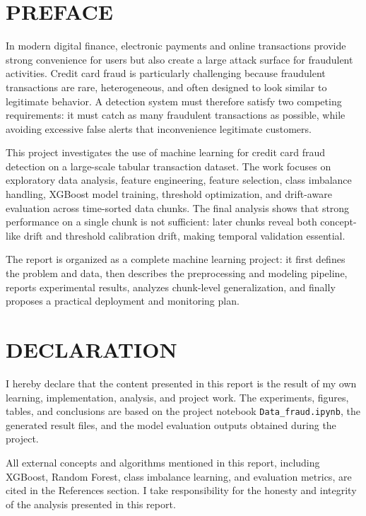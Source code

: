 \documentclass[12pt,a4paper,twoside]{article}
\newcommand{\frontsection}[1]{%
    \section*{\centering #1}%
    \addcontentsline{toc}{section}{#1}%
}
\begin{document}

\frontsection{PREFACE}

In modern digital finance, electronic payments and online transactions provide strong convenience for users but also create a large attack surface for fraudulent activities. Credit card fraud is particularly challenging because fraudulent transactions are rare, heterogeneous, and often designed to look similar to legitimate behavior. A detection system must therefore satisfy two competing requirements: it must catch as many fraudulent transactions as possible, while avoiding excessive false alerts that inconvenience legitimate customers.

This project investigates the use of machine learning for credit card fraud detection on a large-scale tabular transaction dataset. The work focuses on exploratory data analysis, feature engineering, feature selection, class imbalance handling, XGBoost model training, threshold optimization, and drift-aware evaluation across time-sorted data chunks. The final analysis shows that strong performance on a single chunk is not sufficient: later chunks reveal both concept-like drift and threshold calibration drift, making temporal validation essential.

The report is organized as a complete machine learning project: it first defines the problem and data, then describes the preprocessing and modeling pipeline, reports experimental results, analyzes chunk-level generalization, and finally proposes a practical deployment and monitoring plan.

\newpage

\frontsection{DECLARATION}

I hereby declare that the content presented in this report is the result of my own learning, implementation, analysis, and project work. The experiments, figures, tables, and conclusions are based on the project notebook \texttt{Data\_fraud.ipynb}, the generated result files, and the model evaluation outputs obtained during the project.

All external concepts and algorithms mentioned in this report, including XGBoost, Random Forest, class imbalance learning, and evaluation metrics, are cited in the References section. I take responsibility for the honesty and integrity of the analysis presented in this report.
\end{document}
